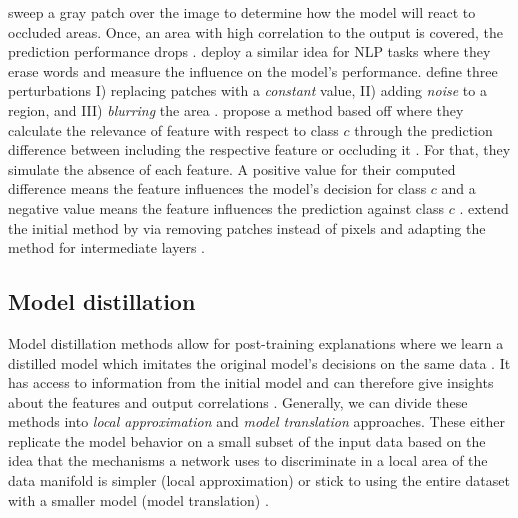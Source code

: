 \citet{ZeilerF14} sweep a gray patch over the image to determine how the model will react to occluded areas. Once, an area with high correlation to the output is covered, the prediction performance drops \citep{xie2020explainable, ZeilerF14}. \citet{li2016understanding} deploy a similar idea for NLP tasks where they erase words and measure the influence on the model's performance. \citet{FongV17} define three perturbations I) replacing patches with a \emph{constant} value, II) adding \emph{noise} to a region, and  III) \emph{blurring} the area \citep{FongV17, xie2020explainable}. \citet{ZintgrafCAW17} propose a method based off \citet{Robnik-SikonjaK08} where they calculate the relevance of feature with respect to class $c$ through the prediction difference between including the respective feature or occluding it \citep{ZintgrafCAW17}. For that, they simulate the absence of each feature. A positive value for their computed difference means the feature influences the model's decision for class $c$ and a negative value means the feature influences the prediction against class $c$ \citep{ZintgrafCAW17}. \citet{ZintgrafCAW17} extend the initial method by \citet{Robnik-SikonjaK08} via removing patches instead of pixels and adapting the method for intermediate layers \citep{xie2020explainable}.

\subsection{Model distillation}
Model distillation methods allow for post-training explanations where we learn a distilled model which imitates the original model's decisions on the same data \citep{xie2020explainable}. It has access to information from the initial model and can therefore give insights about the features and output correlations \citep{xie2020explainable}. Generally, we can divide these methods into \emph{local approximation} and \emph{model translation} approaches. These either replicate the model behavior on a small subset of the input data based on the idea that the mechanisms a network uses to discriminate in a local area of the data manifold is simpler (local approximation) or stick to using the entire dataset with a smaller model (model translation) \citep{xie2020explainable}. 


